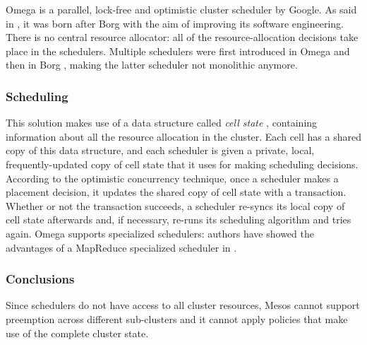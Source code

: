Omega \cite{omega} is a parallel, lock-free and optimistic cluster scheduler by Google.
As said in \cite{borgomegakubernetes}, it was born after Borg \cite{borg} with the aim of improving its software engineering.
There is no central resource allocator: all of the resource-allocation decisions take place in the schedulers.
Multiple schedulers were first introduced in Omega \cite{omega} and then in Borg \cite{borg}, making the latter scheduler not monolithic anymore.

\subsubsection{Scheduling}
This solution makes use of a data structure called \textit{cell state }, containing information about all the resource allocation in the cluster.
Each cell has a shared copy of this data structure, and each scheduler is given a private, local, frequently-updated copy of cell state that it uses for making scheduling decisions.
According to the optimistic concurrency technique, once a scheduler makes a placement decision, it updates the shared copy of cell state with a transaction.
Whether or not the transaction succeeds, a scheduler re-syncs its local copy of cell state afterwards and, if necessary, re-runs its scheduling algorithm and tries again.
Omega \cite{omega} supports specialized schedulers: authors have showed the advantages of a MapReduce \cite{mapreduce} specialized scheduler in \cite{omega}.

\subsubsection{Conclusions}
Since schedulers do not have access to all cluster resources, Mesos \cite{mesos} cannot support preemption across different sub-clusters and it cannot apply policies that make use of the complete cluster state.

